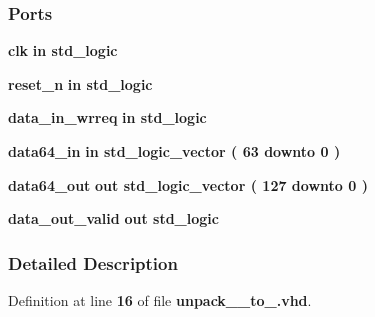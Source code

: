 \subsubsection*{Ports}
 \begin{DoxyCompactItemize}
\item 
{\bf clk}  {\bfseries {\bfseries \textcolor{keywordflow}{in}\textcolor{vhdlchar}{ }}} {\bfseries \textcolor{comment}{std\+\_\+logic}\textcolor{vhdlchar}{ }} 
\item 
{\bf reset\+\_\+n}  {\bfseries {\bfseries \textcolor{keywordflow}{in}\textcolor{vhdlchar}{ }}} {\bfseries \textcolor{comment}{std\+\_\+logic}\textcolor{vhdlchar}{ }} 
\item 
{\bf data\+\_\+in\+\_\+wrreq}  {\bfseries {\bfseries \textcolor{keywordflow}{in}\textcolor{vhdlchar}{ }}} {\bfseries \textcolor{comment}{std\+\_\+logic}\textcolor{vhdlchar}{ }} 
\item 
{\bf data64\+\_\+in}  {\bfseries {\bfseries \textcolor{keywordflow}{in}\textcolor{vhdlchar}{ }}} {\bfseries \textcolor{comment}{std\+\_\+logic\+\_\+vector}\textcolor{vhdlchar}{ }\textcolor{vhdlchar}{(}\textcolor{vhdlchar}{ }\textcolor{vhdlchar}{ } \textcolor{vhdldigit}{63} \textcolor{vhdlchar}{ }\textcolor{keywordflow}{downto}\textcolor{vhdlchar}{ }\textcolor{vhdlchar}{ } \textcolor{vhdldigit}{0} \textcolor{vhdlchar}{ }\textcolor{vhdlchar}{)}\textcolor{vhdlchar}{ }} 
\item 
{\bf data64\+\_\+out}  {\bfseries {\bfseries \textcolor{keywordflow}{out}\textcolor{vhdlchar}{ }}} {\bfseries \textcolor{comment}{std\+\_\+logic\+\_\+vector}\textcolor{vhdlchar}{ }\textcolor{vhdlchar}{(}\textcolor{vhdlchar}{ }\textcolor{vhdlchar}{ } \textcolor{vhdldigit}{127} \textcolor{vhdlchar}{ }\textcolor{keywordflow}{downto}\textcolor{vhdlchar}{ }\textcolor{vhdlchar}{ } \textcolor{vhdldigit}{0} \textcolor{vhdlchar}{ }\textcolor{vhdlchar}{)}\textcolor{vhdlchar}{ }} 
\item 
{\bf data\+\_\+out\+\_\+valid}  {\bfseries {\bfseries \textcolor{keywordflow}{out}\textcolor{vhdlchar}{ }}} {\bfseries \textcolor{comment}{std\+\_\+logic}\textcolor{vhdlchar}{ }} 
\end{DoxyCompactItemize}


\subsubsection{Detailed Description}


Definition at line {\bf 16} of file {\bf unpack\+\_\+\_\+to\+\_.\+vhd}.



